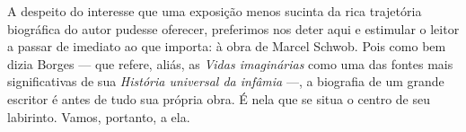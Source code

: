 A despeito do interesse que uma exposição menos sucinta da rica trajetória
biográfica do autor pudesse oferecer, preferimos nos deter aqui e estimular o
leitor a passar de imediato ao que importa: à obra de Marcel Schwob. Pois como
bem dizia Borges --- que refere, aliás, as \textit{Vidas imaginárias} como uma
das fontes mais significativas de sua \textit{História universal da infâmia} ---,
a biografia de um grande escritor é antes de tudo sua própria obra. É nela que
se situa o centro de seu labirinto. Vamos, portanto, a ela.






